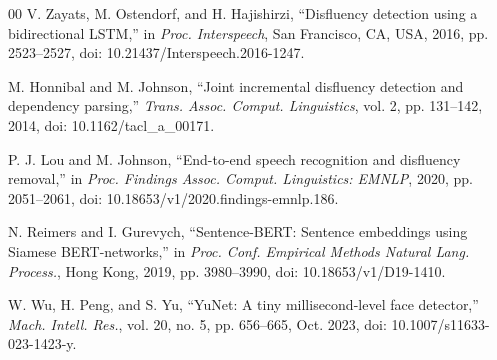 \documentclass{ieeeaccess}
\begin{document}
\begin{thebibliography}{00}
 V. Zayats, M. Ostendorf, and H. Hajishirzi, ``Disfluency detection using a bidirectional LSTM,'' in \emph{Proc. Interspeech}, San Francisco, CA, USA, 2016, pp. 2523--2527, doi: 10.21437/Interspeech.2016-1247.

 M. Honnibal and M. Johnson, ``Joint incremental disfluency detection and dependency parsing,'' \emph{Trans. Assoc. Comput. Linguistics}, vol. 2, pp. 131--142, 2014, doi: 10.1162/tacl\_a\_00171.

 P. J. Lou and M. Johnson, ``End-to-end speech recognition and disfluency removal,'' in \emph{Proc. Findings Assoc. Comput. Linguistics: EMNLP}, 2020, pp. 2051--2061, doi: 10.18653/v1/2020.findings-emnlp.186.

 N. Reimers and I. Gurevych, ``Sentence-BERT: Sentence embeddings using Siamese BERT-networks,'' in \emph{Proc. Conf. Empirical Methods Natural Lang. Process.}, Hong Kong, 2019, pp. 3980--3990, doi: 10.18653/v1/D19-1410.

 W. Wu, H. Peng, and S. Yu, ``YuNet: A tiny millisecond-level face detector,'' \emph{Mach. Intell. Res.}, vol. 20, no. 5, pp. 656--665, Oct. 2023, doi: 10.1007/s11633-023-1423-y.

\end{thebibliography}

\EOD
\end{document}
